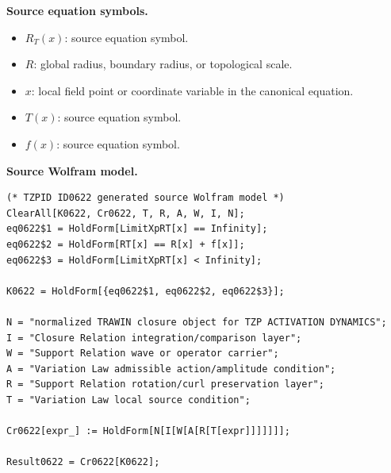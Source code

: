 \begin{minipage}[t]{0.49\linewidth}
\begingroup
\small
\raggedright
\textbf{Source equation symbols.}\par
\begin{itemize}[leftmargin=1.35em,itemsep=1pt,topsep=1pt,parsep=0pt]
    \item $R_T(x)$: source equation symbol.
    \item $R$: global radius, boundary radius, or topological scale.
    \item $x$: local field point or coordinate variable in the canonical equation.
    \item $T(x)$: source equation symbol.
    \item $f(x)$: source equation symbol.
\end{itemize}
\endgroup
\end{minipage}\hfill
\begin{minipage}[t]{0.47\linewidth}
\begingroup
\scriptsize
\raggedright
\textbf{Source Wolfram model.}\par
\begin{Verbatim}[fontsize=\tiny,breaklines=true,breakanywhere=true]
(* TZPID ID0622 generated source Wolfram model *)
ClearAll[K0622, Cr0622, T, R, A, W, I, N];
eq0622$1 = HoldForm[LimitXpRT[x] == Infinity];
eq0622$2 = HoldForm[RT[x] == R[x] + f[x]];
eq0622$3 = HoldForm[LimitXpRT[x] < Infinity];

K0622 = HoldForm[{eq0622$1, eq0622$2, eq0622$3}];

N = "normalized TRAWIN closure object for TZP ACTIVATION DYNAMICS";
I = "Closure Relation integration/comparison layer";
W = "Support Relation wave or operator carrier";
A = "Variation Law admissible action/amplitude condition";
R = "Support Relation rotation/curl preservation layer";
T = "Variation Law local source condition";

Cr0622[expr_] := HoldForm[N[I[W[A[R[T[expr]]]]]]];

Result0622 = Cr0622[K0622];
\end{Verbatim}
\endgroup
\end{minipage}

